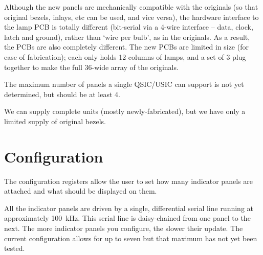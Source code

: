 Although the new panels are mechanically compatible with the originals (so
that original bezels, inlays, etc can be used, and vice versa), the hardware
interface to the lamp PCB is totally different (bit-serial via a 4-wire
interface -- data, clock, latch and ground), rather than `wire per bulb', as
in the originals. As a result, the PCBs are also completely different. The
new PCBs are limited in size (for ease of fabrication); each only holds 12
columns of lamps, and a set of 3 plug together to make the full 36-wide array
of the originals.

The maximum number of panels a single QSIC/USIC can support is not yet
determined, but should be at least 4.

We can supply complete units (mostly newly-fabricated), but we have only a
limited supply of original bezels.

\section{Configuration}

The configuration registers allow the user to set how many indicator
panels are attached and what should be displayed on them.

All the indicator panels are driven by a single, differential serial
line running at approximately 100~kHz.  This serial line is
daisy-chained from one panel to the next.  The more indicator panels
you configure, the slower their update.  The current configuration
allows for up to seven but that maximum has not yet been tested.

\begin{register16}
\end{register16}

\begin{register16}
\end{register16}

